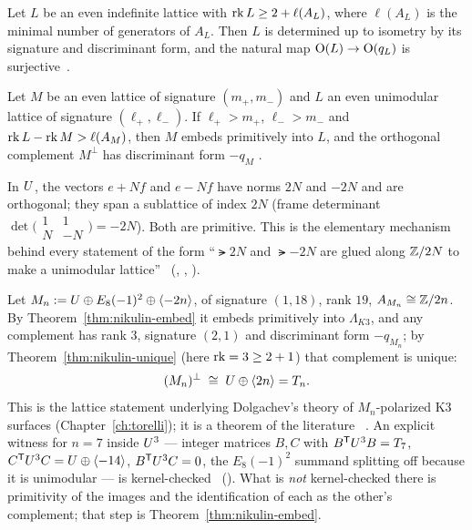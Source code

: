 \begin{theorem}\label{thm:nikulin-unique}
Let $L$ be an even indefinite lattice with $\operatorname{rk} L\ge 2+\ell(A_L)$, where
$\ell(A_L)$ is the minimal number of generators of $A_L$. Then $L$ is
determined up to isometry by its signature and discriminant form, and the
natural map $\operatorname{O}(L)\to\operatorname{O}(q_L)$ is surjective~\cite[Thm.~1.14.2]{Nikulin1979}.
\end{theorem}

\begin{theorem}\label{thm:nikulin-embed}
Let $M$ be an even lattice of signature $(m_+,m_-)$ and $L$ an even unimodular
lattice of signature $(\ell_+,\ell_-)$. If $\ell_+>m_+$, $\ell_->m_-$ and
$\operatorname{rk} L-\operatorname{rk} M>\ell(A_M)$, then $M$ embeds primitively into $L$, and the
orthogonal complement $M^{\perp}$ has discriminant form $-q_M$
\cite[Cor.~1.12.3, Prop.~1.6.1]{Nikulin1979}.
\end{theorem}

\begin{example}\label{ex:glue}
In $U$, the vectors $e+Nf$ and $e-Nf$ have norms $2N$ and $-2N$ and are
orthogonal; they span a sublattice of index $2N$ (frame determinant
$\det\bigl(\begin{smallmatrix}1&1\\N&-N\end{smallmatrix}\bigr)=-2N$). Both
are primitive. This is the elementary mechanism behind every statement of the
form ``$\lat{2N}$ and $\lat{-2N}$ are glued along $\mathbb{Z}/2N$ to make a unimodular
lattice'' \Kstatus~(, ,
).
\end{example}

\begin{example}\label{ex:Mn}
Let $M_n:=U\oplus E_8(-1)^2\oplus\langle -2n\rangle$, of signature $(1,18)$, rank
$19$, $A_{M_n}\cong\mathbb{Z}/2n$. By Theorem~\ref{thm:nikulin-embed} it embeds
primitively into $\Lambda_{K3}$, and any complement has rank $3$, signature
$(2,1)$ and discriminant form $-q_{M_n}$; by Theorem~\ref{thm:nikulin-unique}
(here $\operatorname{rk}=3\ge2+1$) that complement is unique:
\[
  (M_n)^{\perp}\;\cong\;U\oplus\langle 2n\rangle=T_n .
\]
This is the lattice statement underlying Dolgachev's theory of $M_n$-polarized
K3 surfaces (Chapter~\ref{ch:torelli}); it is a theorem of the literature
\Lstatus~\cite[\S7]{Dolgachev1996}. An explicit witness for $n=7$ inside
$U^3$ --- integer matrices $B,C$ with $B^{\mathsf T}U^3B=T_7$,
$C^{\mathsf T}U^3C=U\oplus\langle -14\rangle$, $B^{\mathsf T}U^3C=0$, the $E_8(-1)^2$
summand splitting off because it is unimodular --- is kernel-checked
\Kstatus~(). What is \emph{not}
kernel-checked there is primitivity of the images and the identification of
each as the other's complement; that step is Theorem~\ref{thm:nikulin-embed}.
\end{example}


